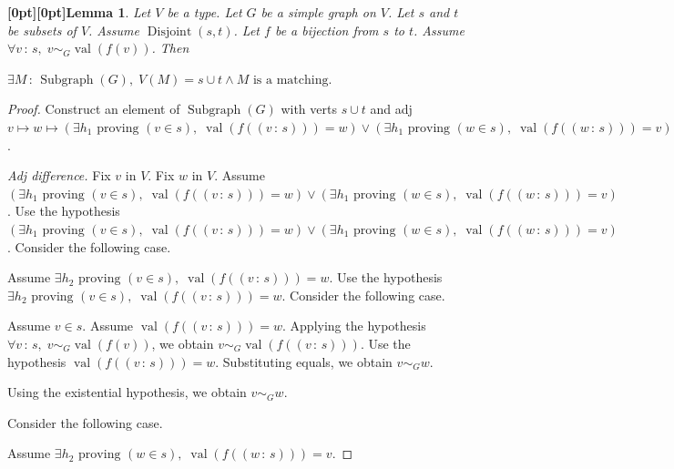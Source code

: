 \documentclass{article}
\makeatletter
\newcommand{\paperanchor}[1]{\hypertarget{#1}{}}%
\def\paperdest{\pdfextension dest}\def\paperstart{\pdfextension startlink}%
\def\paperend{\pdfextension endlink}\def\papercolor{\pdfextension colorstack}%
\let\paperdest\pdfdest\let\paperstart\pdfstartlink\let\paperend\pdfendlink\let\papercolor\pdfcolorstack
\newcommand{\paperanchor}[1]{\paperdest name{#1} xyz}%
\newcommand{\paperanchor}[1]{\special{pdf:dest (#1) [@thispage /XYZ null @ypos null]}}%
\newcommand{\paperlineanchor}[1]{\raisebox{10pt}[0pt][0pt]{\paperanchor{#1}}}
\DeclareRobustCommand{\paperresultname}[1]{\paperlineanchor{theorem:\arabic{theorem}}#1}
\theoremstyle{paperresult}
\newtheorem{lemma}[theorem]{\paperresultname{Lemma}}
\newenvironment{proofstep}{\par\smallskip\ifdim\leftskip<3em\relax\advance\leftskip by 1em\relax\fi\noindent\ignorespaces}{\par\smallskip}
\makeatother
\begin{document}
\begin{lemma}\label{theorem:13}
Let \(V\) be a type. Let \(G\) be a simple graph on \(V\). Let \(s\) and \(t\) be subsets of \(V\). Assume \(\operatorname{Disjoint}\left(s, t\right)\). Let \(f\) be a bijection from \(s\) to \(t\). Assume \(\forall v\, :\, s,\; v \sim_{G} \operatorname{val}(f\left(v\right))\). Then
\begin{center}
\(\displaystyle \exists M\, :\, \operatorname{Subgraph}(G),\; V(M) = s \cup t \land M\text{ is a matching}.\)
\end{center}
\end{lemma}

\begin{proof}
Construct an element of \(\operatorname{Subgraph}\left(G\right)\) with verts \(s \cup t\) and adj \(v \mapsto w \mapsto (\exists h_{1}\text{ proving }(v \in s),\; \operatorname{val}(f((v\, :\, s))) = w) \lor (\exists h_{1}\text{ proving }(w \in s),\; \operatorname{val}(f((w\, :\, s))) = v)\).
\par\smallskip\noindent\emph{Adj difference.}\enspace
Fix \(v\) in \(V\).
Fix \(w\) in \(V\).
Assume \((\exists h_{1}\text{ proving }(v \in s),\; \operatorname{val}(f((v\, :\, s))) = w) \lor (\exists h_{1}\text{ proving }(w \in s),\; \operatorname{val}(f((w\, :\, s))) = v)\).
Use the hypothesis \((\exists h_{1}\text{ proving }(v \in s),\; \operatorname{val}(f((v\, :\, s))) = w) \lor (\exists h_{1}\text{ proving }(w \in s),\; \operatorname{val}(f((w\, :\, s))) = v)\).
Consider the following case.
\begin{proofstep}
Assume \(\exists h_{2}\text{ proving }(v \in s),\; \operatorname{val}(f((v\, :\, s))) = w\).
Use the hypothesis \(\exists h_{2}\text{ proving }(v \in s),\; \operatorname{val}(f((v\, :\, s))) = w\).
Consider the following case.
\begin{proofstep}
Assume \(v \in s\).
Assume \(\operatorname{val}(f\left(\left(v\, :\, s\right)\right)) = w\).
Applying the hypothesis \(\forall v\, :\, s,\; v \sim_{G} \operatorname{val}(f\left(v\right))\), we obtain \(v \sim_{G} \operatorname{val}(f\left(\left(v\, :\, s\right)\right))\).
Use the hypothesis \(\operatorname{val}(f\left(\left(v\, :\, s\right)\right)) = w\).
Substituting equals, we obtain \(v \sim_{G} w\).
\end{proofstep}
Using the existential hypothesis, we obtain \(v \sim_{G} w\).
\end{proofstep}
Consider the following case.
\begin{proofstep}
Assume \(\exists h_{2}\text{ proving }(w \in s),\; \operatorname{val}(f((w\, :\, s))) = v\).

\end{proofstep}
\end{proof}
\end{document}
